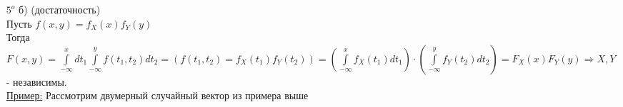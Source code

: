 \begin{enumerate}
\item[$5^o$ б)] \fbox{$\Leftarrow$} (достаточность) \\
Пусть $f(x,y) = f_X(x) f_Y(y)$ \\
Тогда \\
$\displaystyle  F(x,y) = \int\limits_{-\infty}^{x} dt_1 \int\limits_{-\infty}^{y} f(t_1, t_2) dt_2 = \left( f(t_1, t_2) = f_X(t_1) f_Y(t_2) \right) = \left( \int\limits_{-\infty}^{x} f_X(t_1) dt_1 \right) \cdot \left( \int\limits_{-\infty}^{y} f_Y(t_2)dt_2 \right) = F_X(x) F_Y(y) \Rightarrow X,Y$ - независимы. \\
\underline{Пример:} Рассмотрим двумерный случайный вектор из примера выше \\
\end{enumerate}
























